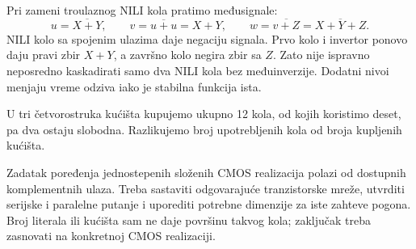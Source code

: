 
Pri zameni troulaznog NILI kola pratimo međusignale:
\[
u=\overline{X+Y},\qquad v=\overline{u+u}=X+Y,\qquad
w=\overline{v+Z}=\overline{X+Y+Z}.
\]
NILI kolo sa spojenim ulazima daje negaciju signala. Prvo kolo i invertor ponovo daju pravi zbir \(X+Y\), a završno kolo negira zbir sa \(Z\). Zato nije ispravno neposredno kaskadirati samo dva NILI kola bez međuinverzije. Dodatni nivoi menjaju vreme odziva iako je stabilna funkcija ista.

U tri četvorostruka kućišta kupujemo ukupno 12 kola, od kojih koristimo deset, pa dva ostaju slobodna. Razlikujemo broj upotrebljenih kola od broja kupljenih kućišta.

Zadatak poređenja jednostepenih složenih CMOS realizacija polazi od dostupnih komplementnih ulaza. Treba sastaviti odgovarajuće tranzistorske mreže, utvrditi serijske i paralelne putanje i uporediti potrebne dimenzije za iste zahteve pogona. Broj literala ili kućišta sam ne daje površinu takvog kola; zaključak treba zasnovati na konkretnoj CMOS realizaciji.
